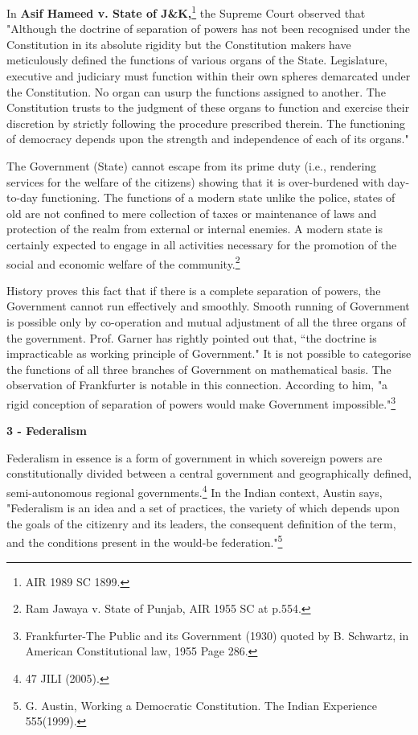 \begin{multicols}{2}
\noi
In \textbf{Asif Hameed v. State of J\&K,}\footnote{AIR 1989 SC 1899.} the Supreme Court observed that "Although the doctrine of
separation of powers has not been recognised under the Constitution in its absolute rigidity but
the Constitution makers have meticulously defined the functions of various organs of the State.
Legislature, executive and judiciary must function within their own spheres demarcated under the
Constitution. No organ can usurp the functions assigned to another. The Constitution trusts to the
judgment of these organs to function and exercise their discretion by strictly following the
procedure prescribed therein. The functioning of democracy depends upon the strength and
independence of each of its organs."

\noi
The Government (State) cannot escape from its prime duty (i.e., rendering services for the welfare
of the citizens) showing that it is over-burdened with day-to-day functioning. The functions of a
modern state unlike the police, states of old are not confined to mere collection of taxes or maintenance of laws and protection of the realm from external or internal enemies. A modern
state is certainly expected to engage in all activities necessary for the promotion of the social and
economic welfare of the community.\footnote{Ram Jawaya v. State of Punjab, AIR 1955 SC at p.554.}

\noi
History proves this fact that if there is a complete separation of powers, the Government cannot
run effectively and smoothly. Smooth running of Government is possible only by co-operation
and mutual adjustment of all the three organs of the government. Prof. Garner has rightly pointed
out that, “the doctrine is impracticable as working principle of Government." It is not possible to
categorise the functions of all three branches of Government on mathematical basis. The
observation of Frankfurter is notable in this connection. According to him, "a rigid conception of
separation of powers would make Government impossible."\footnote{Frankfurter-The Public and its Government (1930) quoted by B. Schwartz, in American Constitutional law, 1955 Page 286.}

\noi
{\large \bfseries 3 - Federalism}

\noi
Federalism in essence is a form of government in which sovereign powers are constitutionally
divided between a central government and geographically defined, semi-autonomous regional
governments.\footnote{47 JILI (2005).} In the Indian context, Austin says, "Federalism is an idea and a set of practices, the variety of which depends upon the goals of the citizenry and its leaders, the consequent definition of the term, and the conditions present in the would-be federation."\footnote{G. Austin, Working a Democratic Constitution. The Indian Experience 555(1999).}


\end{multicols}
